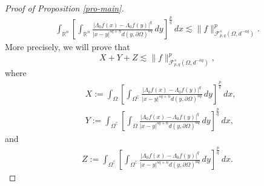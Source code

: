 \documentclass[11pt,twoside]{article}
\def\rn{{\mathbb{R}^n}}
\def\cf{{\mathcal F}}
\def\boz{{\Omega}}
\def\pa{\partial}                %
\theoremstyle{mylem}
\theoremstyle{definition}
\numberwithin{equation}{section}
\begin{document}
\begin{proof}[Proof of Proposition \ref{pro-main}]
\begin{align}\label{eqn-aim}
\int_{\rn} \left[ \int_{\rn} \frac{|\Lambda_0 f(x) - \Lambda_0 f(y)|^q}{|x - y|^{s q + n}d(y,\pa\boz)^{aq}}\,dy \right]^{\frac{p}{q}} \,dx \lesssim \| f \|_{\cf_{p,q}^{s}(\boz,d^{-aq})}^p.
\end{align}
More precisely, we will prove that
\[
X+Y+Z \lesssim \| f \|_{\cf_{p,q}^{s}(\boz,d^{-aq})}^{p},
\]
where 
\begin{align*}
&X:= \int_{\boz} \left[ \int_{{\boz}^\complement} \frac{|\Lambda_0 f(x) - \Lambda_0 f(y)|^q}{|x - y|^{s q + n}d(y,\pa\boz)^{aq}}\,dy \right]^{\frac{p}{q}}\,dx,  \\
&Y:= \int_{{\boz}^\complement} \left[ \int_{\boz} \frac{|\Lambda_0 f(x) - \Lambda_0 f(y)|^q}{|x - y|^{s q + n}d(y,\pa\boz)^{aq}}\,dy \right]^{\frac{p}{q}}\,dx,
\end{align*}
and
\begin{align*}
Z:= \int_{{\boz}^\complement} \left[ \int_{{\boz}^\complement} \frac{|\Lambda_0 f(x) - \Lambda_0 f(y)|^q}{|x - y|^{s q + n}d(y,\pa\boz)^{aq}}\,dy \right]^{\frac{p}{q}}\,dx.
\end{align*}


\end{proof}
\end{document}
